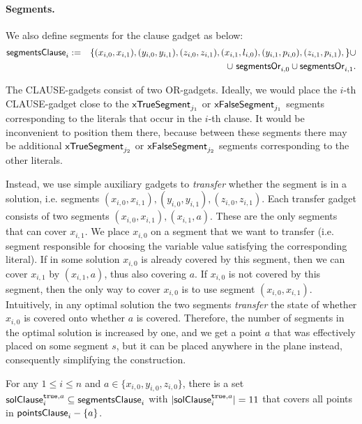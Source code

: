 \paragraph{Segments.}
We also define segments for the clause gadget as below:
\begin{eqnarray*}
\mathsf{segmentsClause}_i & := & \{ (x_{i, 0}, x_{i, 1}),
(y_{i, 0}, y_{i, 1}),
(z_{i, 0}, z_{i, 1}),
(x_{i, 1}, l_{i, 0}),
(y_{i, 1}, p_{i, 0}),
(z_{i, 1}, p_{i, 1}),
\} \cup \\
& & \cup \ \mathsf{segmentsOr}_{i,0} \cup \mathsf{segmentsOr}_{i,1}.
\end{eqnarray*}

\newcommand{\segmentsClauseSolTrue}[1]{\mathsf{solClause}^{\true,#1}}
\newcommand{\segmentsClauseSolFalse}{\mathsf{solClause}^{\false}}

The CLAUSE-gadgets consist of two OR-gadgets.
Ideally, we would place the $i$-th CLAUSE-gadget close to the
$\mathsf{xTrueSegment}_{j_1}$ or $\mathsf{xFalseSegment}_{j_1}$ segments
corresponding to the literals that occur in the $i$-th clause.
It would be inconvenient to position them there,
because between these segments there may be additional
$\mathsf{xTrueSegment}_{j_2}$ or $\mathsf{xFalseSegment}_{j_2}$
segments corresponding to the other literals.

Instead, we use simple auxiliary gadgets to
\textit{transfer} whether the segment
is in a solution, i.e. segments
$(x_{i, 0}, x_{i, 1}), (y_{i, 0}, y_{i, 1}), (z_{i, 0}, z_{i, 1})$.
Each transfer gadget consists of two segments $(x_{i, 0}, x_{i, 1}), (x_{i, 1}, a)$.
These are the only segments that can cover $x_{i,1}$.
We place $x_{i,0}$ on a segment that we want to transfer (i.e.
segment responsible for choosing the variable value satisfying the
corresponding literal).
If in some solution $x_{i,0}$ is already covered by this segment, then
we can cover $x_{i,1}$ by $(x_{i,1}, a)$, thus also covering $a$.
If $x_{i,0}$ is not covered by this segment,
then the only way to cover $x_{i,0}$ is to use segment $(x_{i, 0}, x_{i, 1})$.
Intuitively,
in any optimal solution the two segments \textit{transfer} the state of whether $x_{i,0}$
is covered onto whether $a$ is covered.
Therefore, the number of segments in the optimal solution is increased by one,
and we get a point $a$ that was effectively placed
on some segment $s$, but it can be placed anywhere in the plane instead,
consequently simplifying the construction.

\begin{lemma}
\label{cover_clauses_solution_true}
For any $1 \le i \le n$ and $a \in \{ x_{i, 0}, y_{i, 0}, z_{i, 0}\}$,
there is a set $\segmentsClauseSolTrue{a}_i \subseteq \segmentsClause_i$
with $|\segmentsClauseSolTrue{a}_i| = 11$
that covers all points in $\mathsf{pointsClause}_{i} - \{a\}$.
\end{lemma}

